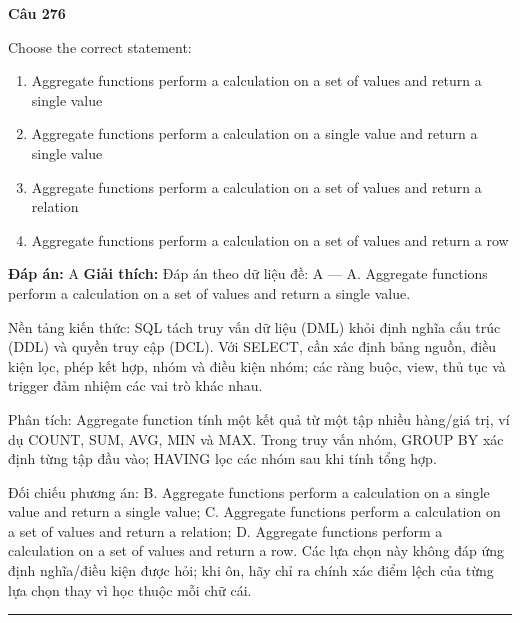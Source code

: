 \documentclass[11pt,a4paper]{article}
\newenvironment{question}[1]{%
  \par\vspace{1em}\noindent\textbf{\large Câu #1}\par\vspace{0.4em}
}{%
  \par\vspace{1em}\hrule\vspace{0.6em}
}
\newenvironment{choices}{%
  \begin{enumerate}[label=\textbf{\Alph*.},leftmargin=2.2em,itemsep=2pt,topsep=3pt]
}{%
  \end{enumerate}
}
\newcommand{\choice}{\item}
\begin{document}
\begin{question}{276}
Choose the correct statement:
\begin{choices}
\choice Aggregate functions perform a calculation on a set of values and return a single value
\choice Aggregate functions perform a calculation on a single value and return a single value
\choice Aggregate functions perform a calculation on a set of values and return a relation
\choice Aggregate functions perform a calculation on a set of values and return a row
\end{choices}
\textbf{Đáp án:} A
\textbf{Giải thích:} Đáp án theo dữ liệu đề: A — A. Aggregate functions perform a calculation on a set of values and return a single value.

Nền tảng kiến thức: SQL tách truy vấn dữ liệu (DML) khỏi định nghĩa cấu trúc (DDL) và quyền truy cập (DCL). Với SELECT, cần xác định bảng nguồn, điều kiện lọc, phép kết hợp, nhóm và điều kiện nhóm; các ràng buộc, view, thủ tục và trigger đảm nhiệm các vai trò khác nhau.

Phân tích: Aggregate function tính một kết quả từ một tập nhiều hàng/giá trị, ví dụ COUNT, SUM, AVG, MIN và MAX. Trong truy vấn nhóm, GROUP BY xác định từng tập đầu vào; HAVING lọc các nhóm sau khi tính tổng hợp.

Đối chiếu phương án: B. Aggregate functions perform a calculation on a single value and return a single value; C. Aggregate functions perform a calculation on a set of values and return a relation; D. Aggregate functions perform a calculation on a set of values and return a row. Các lựa chọn này không đáp ứng định nghĩa/điều kiện được hỏi; khi ôn, hãy chỉ ra chính xác điểm lệch của từng lựa chọn thay vì học thuộc mỗi chữ cái.
\end{question}
\end{document}

